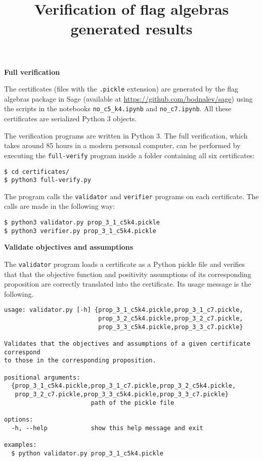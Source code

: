 \documentclass[11pt,a4paper,reqno]{amsart}
\begin{document}
\title[Verification of flag algebras generated results]{Verification of flag algebras generated results}

\maketitle

\textbf{\large Full verification}

The certificates (files with the \verb|.pickle| extension) are generated by the flag
algebras package in Sage (available at
\href{https://github.com/bodnalev/sage}{https://github.com/bodnalev/sage}) using the
scripts in the notebooks \verb|no_c5_k4.ipynb| and \verb|no_c7.ipynb|. All these
certificates are serialized Python 3 objects.

The verification programs are written in Python 3. The full verification, which takes
around 85 hours in a modern personal computer, can be performed by executing the
\verb|full-verify| program inside a folder containing all six certificates:

\begin{Verbatim}[frame=single, fontsize=\small]
$ cd certificates/
$ python3 full-verify.py
\end{Verbatim}

The program calls the \verb|validator| and \verb|verifier| programs on each
certificate. The calls are made in the following way:

\begin{Verbatim}[frame=single, fontsize=\small]
$ python3 validator.py prop_3_1_c5k4.pickle
$ python3 verifier.py prop_3_1_c5k4.pickle
\end{Verbatim}

\textbf{\large Validate objectives and assumptions}

The \verb|validator| program loads a certificate as a Python pickle file and verifies
that that the objective function and positivity assumptions of its corresponding
proposition are correctly translated into the certificate. Its usage message is the
following.

\begin{Verbatim}[frame=single, fontsize=\small]
usage: validator.py [-h] {prop_3_1_c5k4.pickle,prop_3_1_c7.pickle,
                          prop_3_2_c5k4.pickle,prop_3_2_c7.pickle,
                          prop_3_3_c5k4.pickle,prop_3_3_c7.pickle}

Validates that the objectives and assumptions of a given certificate correspond
to those in the corresponding proposition.

positional arguments:
  {prop_3_1_c5k4.pickle,prop_3_1_c7.pickle,prop_3_2_c5k4.pickle,
   prop_3_2_c7.pickle,prop_3_3_c5k4.pickle,prop_3_3_c7.pickle}
                        path of the pickle file

options:
  -h, --help            show this help message and exit

examples:
  $ python validator.py prop_3_1_c5k4.pickle
\end{Verbatim}
\end{document}
